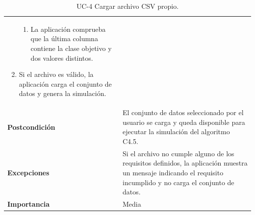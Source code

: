 \begin{table}[p]
\begin{tabularx}{\linewidth}{p{} p{}}
\begin{enumerate}
\begin{enumerate}
                \item La aplicación comprueba que la última columna contiene la clase objetivo y dos valores distintos.
            \end{enumerate}
            \item Si el archivo es válido, la aplicación carga el conjunto de datos y genera la simulación.
        \end{enumerate} \\
        \textbf{Postcondición} & El conjunto de datos seleccionado por el usuario se carga y queda disponible para ejecutar la simulación del algoritmo C4.5. \\
        \textbf{Excepciones} & Si el archivo no cumple alguno de los requisitos definidos, la aplicación muestra un mensaje indicando el requisito incumplido y no carga el conjunto de datos. \\
        \textbf{Importancia} & Media \\
        \bottomrule
    \end{tabularx}
    \caption{UC-4 Cargar archivo CSV propio.}
    \label{tabla:uc_4}
\end{table}


